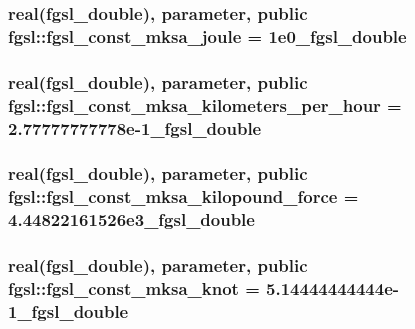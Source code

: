 \hypertarget{classfgsl_a2bb10acb778e8412e7c0bc7e7f95787b}{
\subsubsection[{fgsl\-\_\-const\-\_\-mksa\-\_\-joule}]{\setlength{\rightskip}{0pt plus 5cm}real({\bf fgsl\-\_\-double}), parameter, public fgsl\-::fgsl\-\_\-const\-\_\-mksa\-\_\-joule = 1e0\-\_\-fgsl\-\_\-double}}\label{classfgsl_a2bb10acb778e8412e7c0bc7e7f95787b}
\hypertarget{classfgsl_ae0c1239a6941272700558b0eaf053137}{
\subsubsection[{fgsl\-\_\-const\-\_\-mksa\-\_\-kilometers\-\_\-per\-\_\-hour}]{\setlength{\rightskip}{0pt plus 5cm}real({\bf fgsl\-\_\-double}), parameter, public fgsl\-::fgsl\-\_\-const\-\_\-mksa\-\_\-kilometers\-\_\-per\-\_\-hour = 2.\-77777777778e-\/1\-\_\-fgsl\-\_\-double}}\label{classfgsl_ae0c1239a6941272700558b0eaf053137}
\hypertarget{classfgsl_a7c76b512b50dc8300612e051816e5ede}{
\subsubsection[{fgsl\-\_\-const\-\_\-mksa\-\_\-kilopound\-\_\-force}]{\setlength{\rightskip}{0pt plus 5cm}real({\bf fgsl\-\_\-double}), parameter, public fgsl\-::fgsl\-\_\-const\-\_\-mksa\-\_\-kilopound\-\_\-force = 4.\-44822161526e3\-\_\-fgsl\-\_\-double}}\label{classfgsl_a7c76b512b50dc8300612e051816e5ede}
\hypertarget{classfgsl_a36e83219d4dc03eaba28ee2ee6636c56}{
\subsubsection[{fgsl\-\_\-const\-\_\-mksa\-\_\-knot}]{\setlength{\rightskip}{0pt plus 5cm}real({\bf fgsl\-\_\-double}), parameter, public fgsl\-::fgsl\-\_\-const\-\_\-mksa\-\_\-knot = 5.\-14444444444e-\/1\-\_\-fgsl\-\_\-double}}\label{classfgsl_a36e83219d4dc03eaba28ee2ee6636c56}
